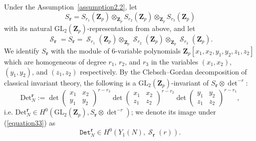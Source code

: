 \documentclass[10pt,letterpaper]{amsart}
\theoremstyle{plain}
\theoremstyle{definition}
\theoremstyle{definition}
\theoremstyle{plain}
\theoremstyle{plain}
\theoremstyle{plain}
\theoremstyle{remark}
\numberwithin{equation}{section}
\DeclareMathOperator{\et}{\acute{e}t}
\DeclareMathOperator{\Ss}{\mathscr{S}}
\newcommand{\Z}{\mathbf{Z}}
\begin{document}
Under the Assumption~\ref{assumption2.2}, let 
\[S_{\mathbf{r}}=S_{r_1}(\Z_p)\otimes_{\Z_p}S_{r_2}(\Z_p)\otimes_{\Z_p}S_{r_3}(\Z_p)\]
with its natural ${\mathrm{GL}}_2(\Z_p)$-representation from above, and let 
\[\Ss_{\mathbf{r}}=S_{\mathbf{r}}^{\et}=\Ss_{r_1}(\Z_p)\otimes_{\Z_p}\Ss_{r_2}(\Z_p)\otimes_{\Z_p}\Ss_{r_3}(\Z_p).\]
We identify $S_{\mathbf{r}}$ with the module of $6$-variable polynomials $\Z_p[x_1,x_2,y_1,y_2,z_1,z_2]$ which are homogeneous of degree $r_1$, $r_2$, and $r_3$ in the variables $(x_1,x_2)$, $(y_1,y_2)$, and $(z_1,z_2)$ respectively. By the Clebsch--Gordan decomposition of classical invariant theory, the following is a ${\mathrm{GL}}_2(\Z_p)$-invariant of $S_{\mathbf{r}}\otimes \det^{-r}$: 
\begin{equation*}
\text{Det}_N^{\mathbf{r}}:=\det\begin{pmatrix}x_1&x_2 \\ y_1&y_2
    \end{pmatrix}^{r-r_3}\det\begin{pmatrix}x_1&x_2 \\ z_1&z_2
    \end{pmatrix}^{r-r_2}\det\begin{pmatrix}y_1&y_2 \\ z_1&z_2
    \end{pmatrix}^{r-r_1},
\end{equation*}
i.e. $\text{Det}_N^{\mathbf{r}}\in H^0({\mathrm{GL}}_2(\Z_p),S_{\mathbf{r}}\otimes\det^{-r})$; we denote its image under (\ref{equation33}) as
\begin{equation}
    \mathtt{Det}^{\mathbf{r}}_N\in H^0_{\et}(Y_1(N),\Ss_{\mathbf{r}}(r)).
\end{equation}
\end{document}
